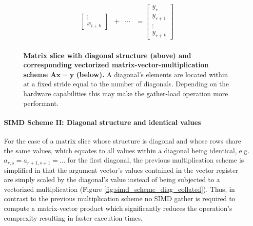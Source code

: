 \begin{figure}[ht]
$$\begin{matrix}
\begin{bmatrix}
                                                                                \vdots \\
                                                                                x_{t+k}
                                                                              \end{bmatrix} & + & \cdots & = \begin{bmatrix}
                                                                                                                 y_{r} \\
                                                                                                                 y_{r+1} \\
                                                                                                                 \vdots \\
                                                                                                                 y_{r+k}
                                                                                                                \end{bmatrix}\\

        \end{matrix}
        $$
        \caption[Matrix slice with diagonal structure and corresponding vectorized matrix-vector multiplication scheme.]{\textbf{Matrix slice with diagonal structure (above) and corresponding vectorized matrix-vector-multiplication scheme $\bm{Ax = y}$ (below).} A diagonal's elements are located within \V at a fixed stride equal to the number of diagonals. Depending on the hardware capabilities this may make the gather-load operation more performant.}
        \label{fig:simd_scheme_diag}
      \end{figure}

      \paragraph{SIMD Scheme II: Diagonal structure and identical values}

      For the case of a matrix slice whose structure is diagonal and whose rows share the same values, which equates to all values within a diagonal being identical, e.g. $a_{r,s} = a_{r+1, s+1} = \ldots$ for the first diagonal, the previous multiplication scheme is simplified in that the argument vector's values contained in the vector register are simply scaled by the diagonal's value instead of being subjected to a vectorized multiplication (Figure \ref{fig:simd_scheme_diag_collated}). Thus, in contrast to the previous multiplication scheme no SIMD gather is required to compute a matrix-vector product which significantly reduces the operation's comprexity resulting in faster execution times.

